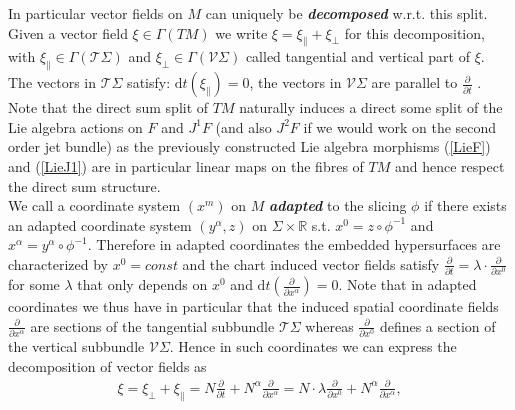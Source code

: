 \documentclass[a4paper,12pt, DIV=14, BCOR=5mm, twoside, headsepline]{scrbook}
\begin{document}
In particular vector fields on $M$ can uniquely be \textit{\textbf{decomposed}} w.r.t. this split. Given a vector field $\xi \in \Gamma(TM)$ we write $\xi = \xi_{\parallel} + \xi_{\perp} $ for this decomposition, with $\xi_{\parallel} \in \Gamma(\mathcal{T}\Sigma)$ and $\xi_{\perp} \in \Gamma(\mathcal{V}\Sigma)$ called tangential and vertical part of $\xi$.
The vectors in $\mathcal{T}\Sigma$ satisfy: $\mathrm{d}t(\xi_{\parallel})=0$, the vectors in $\mathcal{V}\Sigma$ are parallel to $\frac{\partial}{\partial t}$  . Note that the direct sum split of $TM$ naturally induces a direct some split of the Lie algebra actions on $F$ and $J^1F$ (and also $J^2F$ if we would work on the second order jet bundle) as the previously constructed Lie algebra morphisms (\ref{LieF}) and (\ref{LieJ1}) are in particular linear maps on the fibres of $TM$ and hence respect the direct sum structure.\\

We call a coordinate system $(x^m)$ on $M$ \textit{\textbf{adapted}} to the slicing $\phi$ if there exists an adapted coordinate system $(y^{\alpha},z)$ on $\Sigma \times \mathbb{R}$ s.t. $x^0 = z \circ \phi^{-1}$ and $x^{\alpha} = y^{\alpha} \circ \phi^{-1}$. Therefore in adapted coordinates the embedded hypersurfaces are characterized by $x^0 = const$ and the chart induced vector fields satisfy $\frac{\partial}{\partial t} = \lambda \cdot \frac{\partial}{\partial x^0}$ for some $\lambda$ that only depends on $x^0$ and $\mathrm{d}t\left(\frac{\partial}{\partial x^{\alpha}}\right) = 0$.
Note that in adapted coordinates we thus have in particular that the induced spatial coordinate fields $\frac{\partial}{\partial x^{\alpha}}$ are sections of the tangential subbundle $\mathcal{T}\Sigma$ whereas $\frac{\partial}{\partial x^0}$ defines a section of the vertical subbundle $\mathcal{V}\Sigma$. Hence in such coordinates we can express the decomposition of vector fields as 
\begin{align}
    \xi = \xi_{\perp} + \xi_{\parallel} = N  \frac{\partial }{\partial t} + N^{\alpha} \frac{\partial}{\partial x^{\alpha}} = N \cdot \lambda \frac{\partial}{\partial x^0} + N^{\alpha} \frac{\partial}{\partial x^{\alpha}},
\end{align}
\end{document}
